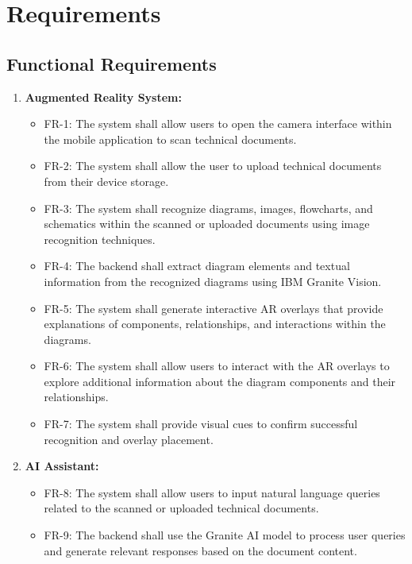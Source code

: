 \documentclass[10pt]{article}
\begin{document}
\newpage

\section{Requirements}
    \subsection{Functional Requirements}

    \begin{enumerate}
        \item \textbf{Augmented Reality System:}
            \begin{itemize}
                \item FR-1: The system shall allow users to open the camera interface within the mobile application to scan technical documents.
                \item FR-2: The system shall allow the user to upload technical documents from their device storage.
                \item FR-3: The system shall recognize diagrams, images, flowcharts, and schematics within the scanned or uploaded documents using image recognition techniques.    
                \item FR-4: The backend shall extract diagram elements and textual information from the recognized diagrams using IBM Granite Vision.
                \item FR-5: The system shall generate interactive AR overlays that provide explanations of components, relationships, and interactions within the diagrams.
                \item FR-6: The system shall allow users to interact with the AR overlays to explore additional information about the diagram components and their relationships.
                \item FR-7: The system shall provide visual cues to confirm successful recognition and overlay placement.
            \end{itemize}
        \item \textbf{AI Assistant:}
            \begin{itemize}
                \item FR-8: The system shall allow users to input natural language queries related to the scanned or uploaded technical documents.
                \item FR-9: The backend shall use the Granite AI model to process user queries and generate relevant responses based on the document content.

\end{itemize}
\end{enumerate}
\end{document}
